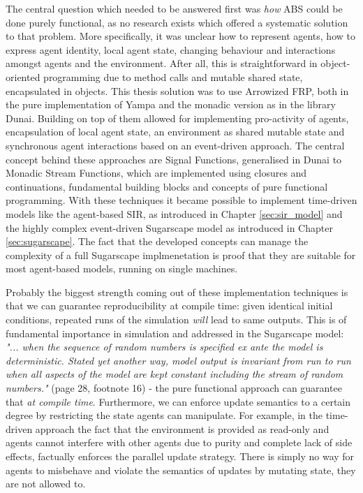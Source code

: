 The central question which needed to be answered first was \textit{how} ABS could be done purely functional, as no research exists which offered a systematic solution to that problem. More specifically, it was unclear how to represent agents, how to express agent identity, local agent state, changing behaviour and interactions amongst agents and the environment. After all, this is straightforward in object-oriented programming due to method calls and mutable shared state, encapsulated in objects. This thesis solution was to use Arrowized FRP, both in the pure implementation of Yampa and the monadic version as in the library Dunai. Building on top of them allowed for implementing pro-activity of agents, encapsulation of local agent state, an environment as shared mutable state and synchronous agent interactions based on an event-driven approach. The central concept behind these approaches are Signal Functions, generalised in Dunai to Monadic Stream Functions, which are implemented using closures and continuations, fundamental building blocks and concepts of pure functional programming. With these techniques it became possible to implement time-driven models like the agent-based SIR, as introduced in Chapter \ref{sec:sir_model} and the highly complex event-driven Sugarscape model as introduced in Chapter \ref{sec:sugarscape}. The fact that the developed concepts can manage the complexity of a full Sugarscape implmenetation is proof that they are suitable for most agent-based models, running on single machines. 

\medskip

Probably the biggest strength coming out of these implementation techniques is that we can guarantee reproducibility at compile time: given identical initial conditions, repeated runs of the simulation \textit{will} lead to same outputs. This is of fundamental importance in simulation and addressed in the Sugarscape model: \textit{"... when the sequence of random numbers is specified ex ante the model is deterministic. Stated yet another way, model output is invariant from run to run when all aspects of the model are kept constant including the stream of random numbers."} (page 28, footnote 16) - the pure functional approach can guarantee that \textit{at compile time}. Furthermore, we can enforce update semantics to a certain degree by restricting the state agents can manipulate. For example, in the time-driven approach the fact that the environment is provided as read-only and agents cannot interfere with other agents due to purity and complete lack of side effects, factually enforces the parallel update strategy. There is simply no way for agents to misbehave and violate the semantics of updates by mutating state, they are not allowed to.

